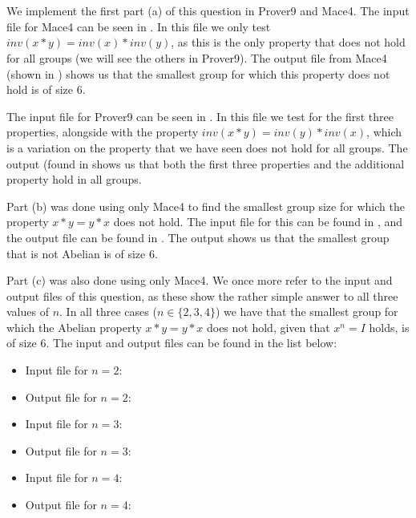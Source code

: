 \chapter{}\label{chp:3}
We implement the first part (a) of this question in Prover9 and Mace4. The input file for Mace4 can be seen in . In this file we only test $inv(x*y) = inv(x) * inv(y)$, as this is the only property that does not hold for all groups (we will see the others in Prover9). The output file from Mace4 (shown in ) shows us that the smallest group for which this property does not hold is of size 6. 

The input file for Prover9 can be seen in . In this file we test for the first three properties, alongside with the property $inv(x*y) = inv(y) * inv(x)$, which is a variation on the property that we have seen does not hold for all groups. The output (found in  shows us that both the first three properties and the additional property hold in all groups. 

Part (b) was done using only Mace4 to find the smallest group size for which the property $x * y = y * x$ does not hold. The input file for this can be found in , and the output file can be found in . The output shows us that the smallest group that is not Abelian is of size 6.

Part (c) was also done using only Mace4. We once more refer to the input and output files of this question, as these show the rather simple answer to all three values of $n$. In all three cases ($n \in \{2,3,4\}$) we have that the smallest group for which the Abelian property $x*y = y*x$ does not hold, given that $x^n = I$ holds, is of size 6. The input and output files can be found in the list below:
\begin{itemize}
    \item Input file for $n=2$: 
    \item Output file for $n=2$: 
    \item Input file for $n=3$: 
    \item Output file for $n=3$: 
    \item Input file for $n=4$: 
    \item Output file for $n=4$: 
\end{itemize}